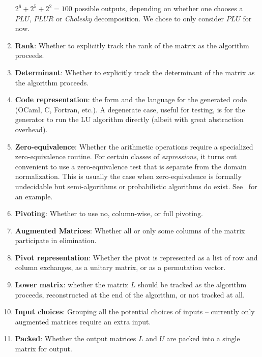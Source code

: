 \documentclass{elsart}
\begin{document}
\begin{enumerate}
        $2^6 + 2^5 + 2^2 = 100$ possible outputs, depending on whether
        one chooses a $PLU$, $PLUR$ or \emph{Cholesky} 
        decomposition.  We chose to only consider $PLU$ for now.
    \item \textbf{Rank}: Whether to explicitly track the rank of the matrix
        as the algorithm proceeds.
    \item \textbf{Determinant}:  Whether to explicitly track the determinant
        of the matrix as the algorithm proceeds.
    \item \textbf{Code representation}: the form and the language
      for the generated code (OCaml, C, Fortran, etc.). A
      degenerate case, useful for testing, is for the generator
      to run the LU algorithm directly (albeit with great
      abstraction overhead).
    \item \textbf{Zero-equivalence}: Whether the 
        arithmetic operations require a specialized zero-equivalence 
        routine.  For certain classes
        of \emph{expressions}, it turns out convenient to use 
        a zero-equivalence
        test that is separate from the domain normalization.  This is
        usually the case when zero-equivalence is formally undecidable
        but semi-algorithms or probabilistic algorithms do exist.
        See~\cite{ZhCaJeMo06a} for an example.
    \item \textbf{Pivoting}: Whether to use no, 
        column-wise, or full pivoting.
    \item \textbf{Augmented Matrices}: Whether all or only some
      columns of the matrix participate in elimination.
    \item \textbf{Pivot representation}: Whether the pivot is represented
      as a list of row and column exchanges, as a unitary matrix,
      or as a permutation vector.
  \item \textbf{Lower matrix}: whether the matrix $L$ should be tracked
      as the algorithm proceeds, reconstructed at the end of the
      algorithm, or not tracked at all.
  \item \textbf{Input choices}: Grouping all the potential
      choices of inputs -- currently only augmented matrices require
      an extra input.
  \item \textbf{Packed}: Whether the output matrices $L$ and $U$ are
      packed into a single matrix for output.
\setcounter{naspects}{\value{enumi}}
\end{enumerate}
\end{document}
